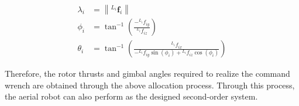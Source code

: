 \begin{subequations}
\label{eq:thrust least4 dragon}
\begin{align}
\lambda_i&=\left\|{}^{L_i}\boldsymbol{f}_i\right\|\\
\phi_i&=\tan^{-1}\left(\frac{-{}^{L_i}f_{iy}}{{}^{L_i}f_{iz}}\right)\\
\theta_i&=\tan^{-1}\left(\frac{{}^{L_i}f_{ix}}{-{}^{L_i}f_{iy}\sin(\phi_i)+{}^{L_i}f_{iz}\cos(\phi_i)}\right)
\end{align}
\end{subequations}

Therefore, the rotor thrusts and gimbal angles required to realize the command wrench are obtained through the above allocation process. Through this process, the aerial robot can also perform as the designed second-order system.

